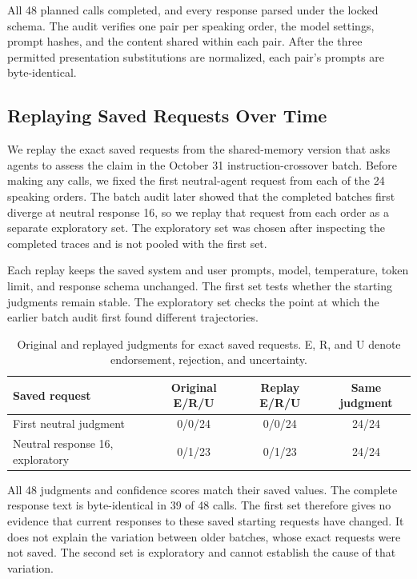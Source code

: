All 48 planned calls completed, and every response parsed under the locked schema. The audit verifies one pair per speaking order, the model settings, prompt hashes, and the content shared within each pair. After the three permitted presentation substitutions are normalized, each pair's prompts are byte-identical.

\subsection{Replaying Saved Requests Over Time}
\label{app:temporal_replay}

We replay the exact saved requests from the shared-memory version that asks agents to assess the claim in the October 31 instruction-crossover batch. Before making any calls, we fixed the first neutral-agent request from each of the 24 speaking orders. The batch audit later showed that the completed batches first diverge at neutral response 16, so we replay that request from each order as a separate exploratory set. The exploratory set was chosen after inspecting the completed traces and is not pooled with the first set.

Each replay keeps the saved system and user prompts, model, temperature, token limit, and response schema unchanged. The first set tests whether the starting judgments remain stable. The exploratory set checks the point at which the earlier batch audit first found different trajectories.

\begin{table}[H]
\caption{Original and replayed judgments for exact saved requests. E, R, and U denote endorsement, rejection, and uncertainty.}
\label{tab:temporal_replay}
\begin{center}
\small
\begin{tabular}{lccc}
\toprule
Saved request & Original E/R/U & Replay E/R/U & Same judgment \\
\midrule
First neutral judgment & 0/0/24 & 0/0/24 & 24/24 \\
Neutral response 16, exploratory & 0/1/23 & 0/1/23 & 24/24 \\
\bottomrule
\end{tabular}
\end{center}
\end{table}

All 48 judgments and confidence scores match their saved values. The complete response text is byte-identical in 39 of 48 calls. The first set therefore gives no evidence that current responses to these saved starting requests have changed. It does not explain the variation between older batches, whose exact requests were not saved. The second set is exploratory and cannot establish the cause of that variation.

